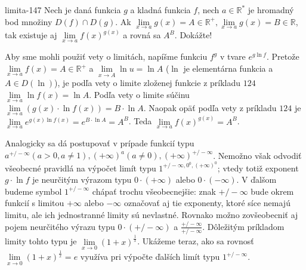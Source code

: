 \begin{defproblem}{limita-147}
Nech je daná funkcia $g$ a kladná funkcia $f$, nech $a \in \mathbb{R^*}$ je
hromadný bod množiny $D(f)\cap D(g)$. Ak $\lim\limits_{x \rightarrow a} g(x)=A
\in \mathbb{R^+},\lim\limits_{x \rightarrow a} g(x)=B \in \mathbb{R}$, tak
existuje aj $\lim\limits_{x \rightarrow a} f(x)^{g(x)}$ a rovná sa $A^B$.
Dokážte!

\begin{solution}
    Aby sme mohli použiť vety o limitách, napíšme funkciu $f^g$ v tvare $e^{g \ln
    f}$. Pretože  $\lim\limits_{x \rightarrow a} f(x)=A \in \mathbb{R^+}$ a
    $\lim\limits_{x \rightarrow A} \ln u= \ln A$ ($\ln$ je elementárna funkcia a $A
    \in D(\ln)$), je podľa vety o limite zloženej funkcie z príkladu $124$
    $\lim\limits_{x \rightarrow a} \ln f(x)=\ln A$. Podľa vety o limite súčinu
    $\lim\limits_{x \rightarrow a} (g(x)\cdot \ln f(x))=B \cdot \ln A$. Naopak
    opäť podľa vety z príkladu $124$ je $\lim\limits_{x \rightarrow a} e^{g(x)\ln
    f(x)}=e^{B \cdot \ln A}=A^B$. Teda $\lim\limits_{x \rightarrow a}
    f(x)^{g(x)}=A^B$.

    Analogicky sa dá postupovať v prípade funkcií typu $a^{+/- \infty}(a>0,a
    \neq 1),(+\infty)^a(a \neq 0),(+\infty)^{+/- \infty}$. Nemožno však odvodiť
    všeobecné pravidlá na výpočet limít typu $1^{+/- \infty,0^0,(+\infty)^0}$;
    vtedy totiž exponent $g \cdot \ln f$ je neurčitým výrazom typu $0 \cdot
    (+\infty)$ alebo $0 \cdot (-\infty)$. V ďalšom budeme symbol $1^{+/-
    \infty}$ chápať trochu všeobecnejšie: znak $+/- \infty$ bude okrem funkcií s
    limitou $+\infty$ alebo $-\infty$ označovať aj tie exponenty, ktoré síce
    nemajú limitu, ale ich jednostranné limity sú nevlastné. Rovnako možno
    zovšeobecniť aj pojem neurčitého výrazu typu $0 \cdot (+/- \infty)$ a
    $\frac{+/- \infty}{+/- \infty}$. Dôležitým príkladom limity tohto typu je
    $\lim\limits_{x \rightarrow 0} (1+x)^{\frac{1}{x}}$. Ukážeme teraz, ako sa
    rovnosť $\lim\limits_{x \rightarrow 0} (1+x)^{\frac{1}{x}}=e$ využíva pri
    výpočte ďalších limít typu $1^{+/- \infty}$.
\end{solution}
\end{defproblem}


